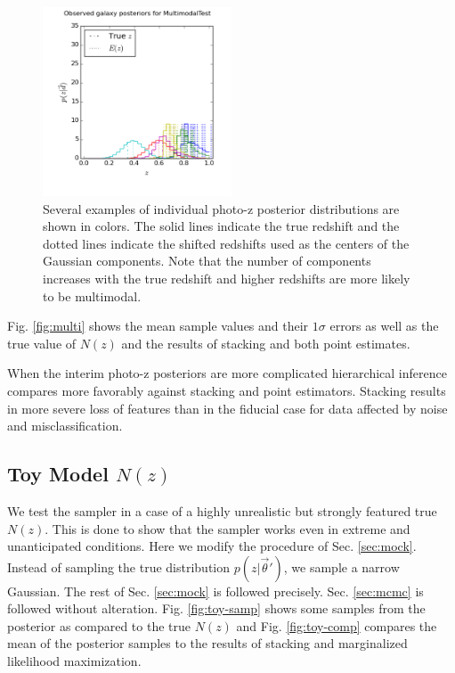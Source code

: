\documentclass[preprint]{aastex}
\begin{document}
\begin{figure}
\includegraphics[width=0.5\textwidth]{multi/samplepzs.png}
\caption{Several examples of individual photo-z posterior distributions are 
shown in colors.  The solid lines indicate the true redshift and the dotted 
lines indicate the shifted redshifts used as the centers of the Gaussian 
components.  Note that the number of components increases with the true 
redshift and higher redshifts are more likely to be multimodal.}
\label{fig:multipzs}
\end{figure}

Fig. \ref{fig:multi} shows the mean sample values and their $1\sigma$ errors as 
well as the true value of $N(z)$ and the results of stacking and both point 
estimates.

\begin{figure}
\caption{}
\label{fig:multi-samp}
\end{figure}

\begin{figure}
\caption{}
\label{fig:multi-comp}
\end{figure}

When the interim photo-z posteriors are more complicated hierarchical inference 
compares more favorably against stacking and point estimators.   Stacking 
results in more severe loss of features than in the fiducial case for data 
affected by noise and misclassification.  

\clearpage
\subsection{Toy Model $N(z)$}
\label{sec:fake}

We test the sampler in a case of a highly unrealistic but strongly featured 
true $N(z)$.  This is done to show that the sampler works even in extreme and 
unanticipated conditions.  Here we modify the procedure of Sec. \ref{sec:mock}. 
 Instead of sampling the true distribution $p(z|\vec{\theta}')$, we sample a 
narrow Gaussian.  The rest of Sec. \ref{sec:mock} is followed precisely.  Sec. 
\ref{sec:mcmc} is followed without alteration.  Fig. \ref{fig:toy-samp} shows 
some samples from the posterior as compared to the true $N(z)$ and Fig. 
\ref{fig:toy-comp} compares the mean of the posterior samples to the results of 
stacking and marginalized likelihood maximization.
\end{document}
